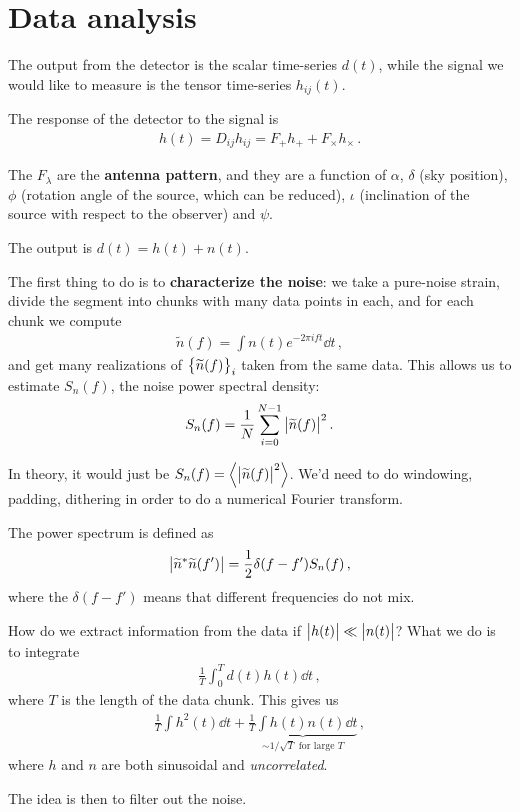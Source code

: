\documentclass[main.tex]{subfiles}
\begin{document}
\section{Data analysis}


The output from the detector is the scalar time-series \(d(t)\), while the signal we would like to measure is the tensor time-series \(h_{ij}(t)\). 

The response of the detector to the signal is 
%
\begin{align}
h(t) = D_{ij} h_{ij} = F_+ h_+ + F_{\times } h_{\times } 
\,.
\end{align}
%

The \(F_\lambda  \) are the \textbf{antenna pattern}, and they are a function of \(\alpha\), \(\delta \) (sky position), \(\phi \) (rotation angle of the source, which can be reduced), \(\iota \) (inclination of the source with respect to the observer) and \(\psi \). 

The output is \(d(t) = h(t) + n(t)\). 

The first thing to do is to \textbf{characterize the noise}: we take a pure-noise strain, divide the segment into chunks with many data points in each, and for each chunk we compute 
%
\begin{align}
\widetilde{n}(f) = \int n(t) e^{-2 \pi i f t } \dd{t} 
\,,
\end{align}
%
and get many realizations of \(\qty{\widetilde{n}(f)}_{i}\) taken from the same data. 
This allows us to estimate \(S_n(f)\), the noise power spectral density: 
%
\begin{align}
S_n(f) = \frac{1}{N} \sum _{i=0}^{N-1} \abs{\widetilde{n}(f)}^2
\,.
\end{align}

In theory, it would just be \(S_n(f) = \expval{\abs{\widetilde{n}(f)}^2}\). 
We'd need to do windowing, padding, dithering in  order to do a numerical Fourier transform. 

The power spectrum is defined as 
%
\begin{align}
\abs{\widetilde{n}^{*} \widetilde{n}(f')} = \frac{1}{2} \delta (f - f') S_n(f)
\,,
\end{align}
%
where the \(\delta (f - f')\) means that different frequencies do not mix.  

How do we extract information from the data if \(\abs{h(t)} \ll \abs{n(t)}\)? 
What we do is to integrate 
%
\begin{align}
\frac{1}{T} \int_{0}^{T} d(t) h(t) \dd{t}
\,,
\end{align}
%
where \(T\) is the length of the data chunk. This gives us 
%
\begin{align}
\frac{1}{T} \int h^2 (t) \dd{t} + \underbrace{\frac{1}{T} \int h(t) n(t) \dd{t}}_{ \sim 1/\sqrt{T} \text{ for large } T}
\,,
\end{align}
%
where \(h\) and \(n\) are both sinusoidal and \emph{uncorrelated}. 

The idea is then to filter out the noise. 
\end{document}
